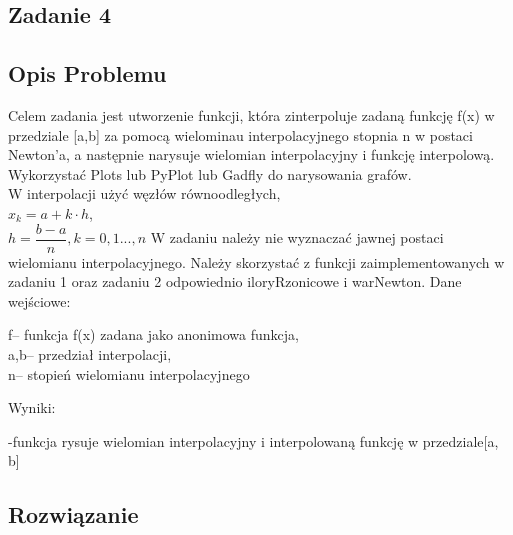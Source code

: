 \documentclass[11pt]{article}
\begin{document}
\begin{flushleft}
\section{Zadanie 4}
\subsection{Opis Problemu}
Celem zadania jest utworzenie funkcji, która zinterpoluje zadaną funkcję f(x) w przedziale [a,b] za pomocą wielominau interpolacyjnego stopnia n w postaci Newton'a, a następnie narysuje wielomian interpolacyjny i funkcję interpolową. Wykorzystać Plots lub PyPlot lub Gadfly do narysowania grafów.\\
\quad W interpolacji użyć węzłów równoodległych, \\
\bigskip
\quad\quad$x_k=a+k\cdot h$,\\
\quad\quad $h =\dfrac{b-a}{n}, k = 0,1...,n$
W zadaniu należy nie wyznaczać jawnej postaci wielomianu interpolacyjnego. Należy skorzystać z funkcji zaimplementowanych w zadaniu 1 oraz zadaniu 2 odpowiednio iloryRzonicowe i warNewton. Dane wejściowe:\\
\begin{center}
f– funkcja f(x) zadana jako anonimowa funkcja,\\
a,b– przedział interpolacji, 
\\n– stopień wielomianu interpolacyjnego
\begin{flushleft}
Wyniki:
\end{flushleft}
-funkcja rysuje wielomian interpolacyjny i interpolowaną funkcję w przedziale[a, b]
\end{center}

\subsection{Rozwiązanie}

\end{flushleft}
\end{document}
